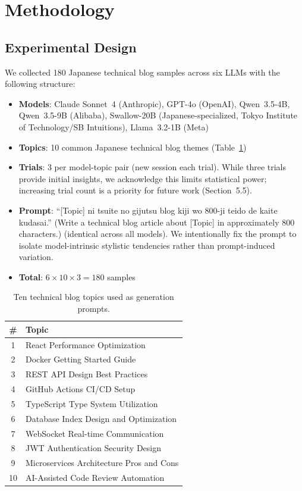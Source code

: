 \documentclass[11pt,a4paper]{article}
\begin{document}
\section{Methodology}

\subsection{Experimental Design}

We collected 180 Japanese technical blog samples across six LLMs with the following structure:

\begin{itemize}
    \item \textbf{Models}: Claude Sonnet~4 (Anthropic), GPT-4o (OpenAI), Qwen~3.5-4B, Qwen~3.5-9B (Alibaba), Swallow-20B (Japanese-specialized, Tokyo Institute of Technology/SB Intuitions), Llama~3.2-1B (Meta)
    \item \textbf{Topics}: 10 common Japanese technical blog themes (Table~\ref{tab:topics})
    \item \textbf{Trials}: 3 per model-topic pair (new session each trial). While three trials provide initial insights, we acknowledge this limits statistical power; increasing trial count is a priority for future work (Section~5.5).
    \item \textbf{Prompt}: ``[Topic] ni tsuite no gijutsu blog kiji wo 800-ji teido de kaite kudasai.'' (Write a technical blog article about [Topic] in approximately 800 characters.) (identical across all models). We intentionally fix the prompt to isolate model-intrinsic stylistic tendencies rather than prompt-induced variation.
    \item \textbf{Total}: $6 \times 10 \times 3 = 180$ samples
\end{itemize}

\begin{table}[H]
\centering
\caption{Ten technical blog topics used as generation prompts.}
\label{tab:topics}
\begin{tabular}{cl}
\toprule
\textbf{\#} & \textbf{Topic} \\
\midrule
1 & React Performance Optimization \\
2 & Docker Getting Started Guide \\
3 & REST API Design Best Practices \\
4 & GitHub Actions CI/CD Setup \\
5 & TypeScript Type System Utilization \\
6 & Database Index Design and Optimization \\
7 & WebSocket Real-time Communication \\
8 & JWT Authentication Security Design \\
9 & Microservices Architecture Pros and Cons \\
10 & AI-Assisted Code Review Automation \\
\bottomrule
\end{tabular}
\end{table}
\end{document}
